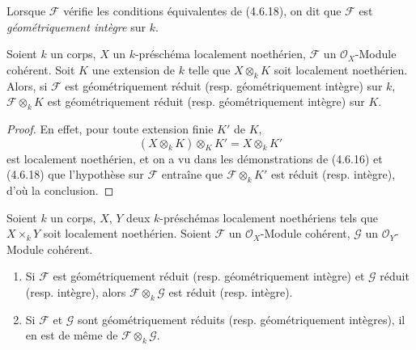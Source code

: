 \begin{definition}[4.6.19]
\label{IV.2.4.6.19-fr}
Lorsque $\mathscr F$ vérifie les conditions équivalentes de (4.6.18), on dit
que $\mathscr F$ est \emph{géométriquement intègre} sur $k$.
\end{definition}

\begin{proposition}[4.6.20]
\label{IV.2.4.6.20-fr}
Soient $k$ un corps, $X$ un $k$-préschéma localement noethérien, $\mathscr F$
un $\mathcal O_X$-Module cohérent. Soit $K$ une extension de $k$ telle que
$X\otimes_k K$ soit localement noethérien. Alors, si $\mathscr F$ est
géométriquement réduit (resp. géométriquement intègre) sur $k$,
$\mathscr F\otimes_k K$ est géométriquement réduit (resp. géométriquement
intègre) sur $K$.
\end{proposition}

\begin{proof}
En effet, pour toute extension finie $K'$ de $K$,
\[
(X\otimes_k K)\otimes_K K'=X\otimes_k K'
\]
est localement noethérien, et on a vu dans les démonstrations de (4.6.16) et
(4.6.18) que l'hypothèse sur $\mathscr F$ entraîne que
$\mathscr F\otimes_k K'$ est réduit (resp. intègre), d'où la conclusion.
\end{proof}

\begin{proposition}[4.6.21]
\label{IV.2.4.6.21-fr}
Soient $k$ un corps, $X$, $Y$ deux $k$-préschémas localement noethériens tels
que $X\times_k Y$ soit localement noethérien. Soient $\mathscr F$ un
$\mathcal O_X$-Module cohérent, $\mathscr G$ un $\mathcal O_Y$-Module cohérent.
\begin{enumerate}
\item[(i)] Si $\mathscr F$ est géométriquement réduit (resp. géométriquement
intègre) et $\mathscr G$ réduit (resp. intègre), alors
$\mathscr F\otimes_k\mathscr G$ est réduit (resp. intègre).
\item[(ii)] Si $\mathscr F$ et $\mathscr G$ sont géométriquement réduits (resp.
géométriquement intègres), il en est de même de
$\mathscr F\otimes_k\mathscr G$.
\end{enumerate}
\end{proposition}

